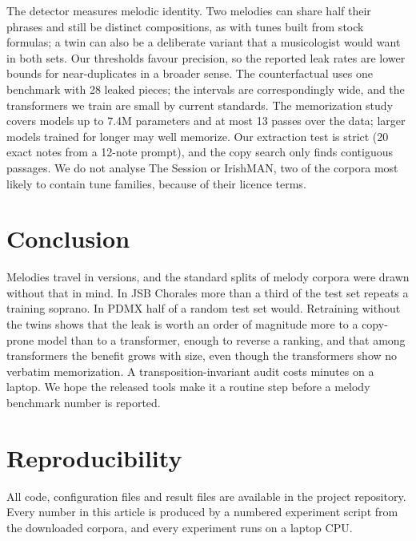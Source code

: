 \documentclass[ProofPDF]{./Styles/Jnls-Template-V3}
\begin{document}
The detector measures melodic identity. Two melodies can share half their phrases and still be distinct compositions, as with tunes built from stock formulas; a twin can also be a deliberate variant that a musicologist would want in both sets. Our thresholds favour precision, so the reported leak rates are lower bounds for near-duplicates in a broader sense. The counterfactual uses one benchmark with 28 leaked pieces; the intervals are correspondingly wide, and the transformers we train are small by current standards. The memorization study covers models up to 7.4M parameters and at most 13 passes over the data; larger models trained for longer may well memorize. Our extraction test is strict (20 exact notes from a 12-note prompt), and the copy search only finds contiguous passages. We do not analyse The Session or IrishMAN, two of the corpora most likely to contain tune families, because of their licence terms.

\section{Conclusion}\label{sec:conclusion}

Melodies travel in versions, and the standard splits of melody corpora were drawn without that in mind. In JSB Chorales more than a third of the test set repeats a training soprano. In PDMX half of a random test set would. Retraining without the twins shows that the leak is worth an order of magnitude more to a copy-prone model than to a transformer, enough to reverse a ranking, and that among transformers the benefit grows with size, even though the transformers show no verbatim memorization. A transposition-invariant audit costs minutes on a laptop. We hope the released tools make it a routine step before a melody benchmark number is reported.

\section{Reproducibility}
All code, configuration files and result files are available in the project repository. Every number in this article is produced by a numbered experiment script from the downloaded corpora, and every experiment runs on a laptop CPU.
\end{document}
